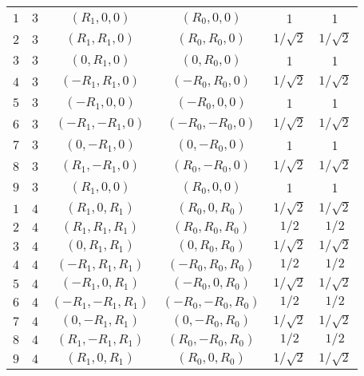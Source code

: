 \begin{center}
\begin{longtable}{c c c c c c}
	$1$		&	$3$	&	$( R_1, 0  , 0)$		&	$( R_0, 0  , 0)$		& 1 			& 1				\\
	$2$		&	$3$	&	$( R_1, R_1, 0)$		&	$( R_0, R_0, 0)$		& $1/\sqrt{2}$ 	& $1/\sqrt{2}$ 	\\
	$3$		&	$3$	&	$( 0  , R_1, 0)$		&	$( 0  , R_0, 0)$		& 1 			& 1				\\
	$4$		&	$3$	&	$(-R_1, R_1, 0)$		&	$(-R_0, R_0, 0)$		& $1/\sqrt{2}$ 	& $1/\sqrt{2}$ 	\\
	$5$		&	$3$	&	$(-R_1, 0  , 0)$		&	$(-R_0, 0  , 0)$		& 1 			& 1				\\
	$6$		&	$3$	&	$(-R_1,-R_1, 0)$		&	$(-R_0,-R_0, 0)$		& $1/\sqrt{2}$ 	& $1/\sqrt{2}$ 	\\
	$7$		&	$3$	&	$( 0  ,-R_1, 0)$		&	$( 0  ,-R_0, 0)$		& 1 			& 1				\\
	$8$		&	$3$	&	$( R_1,-R_1, 0)$		&	$( R_0,-R_0, 0)$		& $1/\sqrt{2}$ 	& $1/\sqrt{2}$ 	\\
	$9$		&	$3$	&	$( R_1, 0  , 0)$		&	$( R_0, 0  , 0)$		& 1 			& 1				\\
	
	$1$		&	$4$	&	$( R_1, 0  , R_1)$		&	$( R_0, 0  , R_0)$		& $1/\sqrt{2}$ 	& $1/\sqrt{2}$	\\
	$2$		&	$4$	&	$( R_1, R_1, R_1)$		&	$( R_0, R_0, R_0)$		& $1/2$ 		& $1/2$ 		\\
	$3$		&	$4$	&	$( 0  , R_1, R_1)$		&	$( 0  , R_0, R_0)$		& $1/\sqrt{2}$ 	& $1/\sqrt{2}$	\\
	$4$		&	$4$	&	$(-R_1, R_1, R_1)$		&	$(-R_0, R_0, R_0)$		& $1/2$ 		& $1/2$ 		\\
	$5$		&	$4$	&	$(-R_1, 0  , R_1)$		&	$(-R_0, 0  , R_0)$		& $1/\sqrt{2}$	& $1/\sqrt{2}$	\\
	$6$		&	$4$	&	$(-R_1,-R_1, R_1)$		&	$(-R_0,-R_0, R_0)$  		& $1/2$ 		& $1/2$ 		\\
	$7$		&	$4$	&	$( 0  ,-R_1, R_1)$		&	$( 0  ,-R_0, R_0)$		& $1/\sqrt{2}$ 	& $1/\sqrt{2}$	\\
	$8$		&	$4$	&	$( R_1,-R_1, R_1)$		&	$( R_0,-R_0, R_0)$		& $1/2$ 		& $1/2$ 		\\
	$9$		&	$4$	&	$( R_1, 0  , R_1)$		&	$( R_0, 0  , R_0)$		& $1/\sqrt{2}$ 	& $1/\sqrt{2}$	\\
	

\end{longtable}
\end{center}
